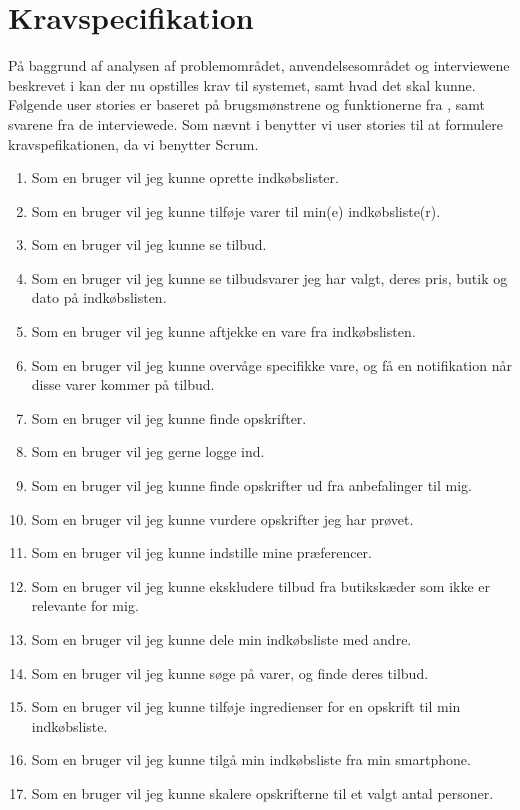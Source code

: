 \section{Kravspecifikation}\label{sec:krav}

På baggrund af analysen af problemområdet, anvendelsesområdet og interviewene beskrevet i   kan der nu opstilles krav til systemet, samt hvad det skal kunne.
Følgende user stories er baseret på brugsmønstrene og funktionerne fra , samt svarene fra de interviewede.
Som nævnt i  benytter vi user stories til at formulere kravspefikationen, da vi benytter Scrum.
\begin{enumerate}
	\item Som en bruger vil jeg kunne oprette indkøbslister.
	\item Som en bruger vil jeg kunne tilføje varer til min(e) indkøbsliste(r).
	\item Som en bruger vil jeg kunne se tilbud.
	\item Som en bruger vil jeg kunne se tilbudsvarer jeg har valgt, deres pris, butik og dato på indkøbslisten.
	\item Som en bruger vil jeg kunne aftjekke en vare fra indkøbslisten.
	\item Som en bruger vil jeg kunne overvåge specifikke vare, og få en notifikation når disse varer kommer på tilbud.
	\item Som en bruger vil jeg kunne finde opskrifter.
	\item Som en bruger vil jeg gerne logge ind.
	\item Som en bruger vil jeg kunne finde opskrifter ud fra anbefalinger til mig.
	\item Som en bruger vil jeg kunne vurdere opskrifter jeg har prøvet.
	\item Som en bruger vil jeg kunne indstille mine præferencer.
	\item Som en bruger vil jeg kunne ekskludere tilbud fra butikskæder som ikke er relevante for mig.
	\item Som en bruger vil jeg kunne dele min indkøbsliste med andre.
	\item Som en bruger vil jeg kunne søge på varer, og finde deres tilbud.
	\item Som en bruger vil jeg kunne tilføje ingredienser for en opskrift til min indkøbsliste.
	\item Som en bruger vil jeg kunne tilgå min indkøbsliste fra min smartphone.
	\item Som en bruger vil jeg kunne skalere opskrifterne til et valgt antal personer.
\end{enumerate}

